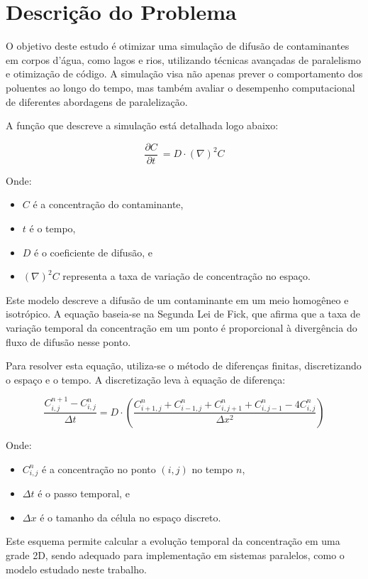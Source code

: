 \section{Descrição do Problema} \label{sec:firstpage}

O objetivo deste estudo é otimizar uma simulação de difusão de contaminantes em corpos d'água, como lagos e rios, utilizando técnicas avançadas de paralelismo e otimização de código. A simulação visa não apenas prever o comportamento dos poluentes ao longo do tempo, mas também avaliar o desempenho computacional de diferentes abordagens de paralelização.

A função que descreve a simulação está detalhada logo abaixo:

\[\frac{\partial C}{\partial t}\ = D \cdot (\nabla)^{2} C \]

Onde:
\begin{itemize}
    \item \( C \) é a concentração do contaminante,
    \item \( t \) é o tempo,
    \item \( D \) é o coeficiente de difusão, e
    \item \( (\nabla)^{2} C \) representa a taxa de variação de concentração no espaço.
\end{itemize}

Este modelo descreve a difusão de um contaminante em um meio homogêneo e isotrópico. A equação baseia-se na Segunda Lei de Fick, que afirma que a taxa de variação temporal da concentração em um ponto é proporcional à divergência do fluxo de difusão nesse ponto.

Para resolver esta equação, utiliza-se o método de diferenças finitas, discretizando o espaço e o tempo. A discretização leva à equação de diferença:

\[
    \frac{C^{n+1}_{i,j} - C^{n}_{i,j}}{\Delta t} = D \cdot \left( \frac{C^{n}_{i+1,j} + C^{n}_{i-1,j} + C^{n}_{i,j+1} + C^{n}_{i,j-1} - 4C^{n}_{i,j}}{\Delta x^2} \right)
\]

Onde:
\begin{itemize}
    \item \( C^{n}_{i,j} \) é a concentração no ponto \( (i,j) \) no tempo \( n \),
    \item \( \Delta t \) é o passo temporal, e
    \item \( \Delta x \) é o tamanho da célula no espaço discreto.
\end{itemize}

Este esquema permite calcular a evolução temporal da concentração em uma grade 2D, sendo adequado para implementação em sistemas paralelos, como o modelo estudado neste trabalho.
